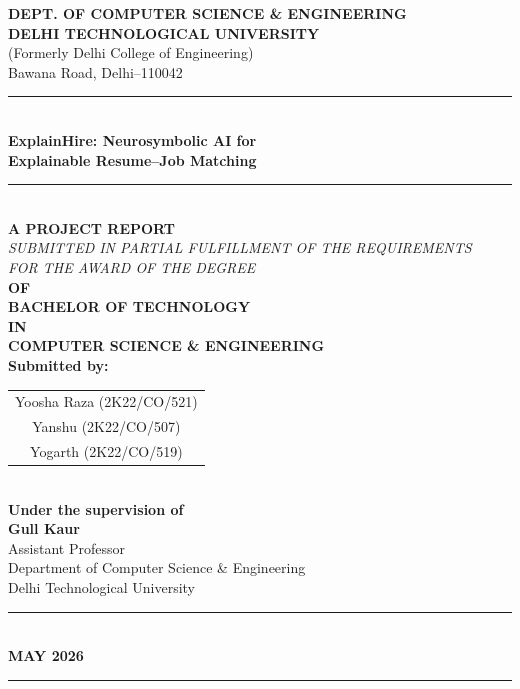 \documentclass[12pt,a4paper]{report}
\begin{document}
\begin{titlepage}
\pagestyle{empty}
\begin{center}

\textbf{\large DEPT. OF COMPUTER SCIENCE \& ENGINEERING}\\[4pt]
\textbf{\large DELHI TECHNOLOGICAL UNIVERSITY}\\[2pt]
{\small (Formerly Delhi College of Engineering)}\\
{\small Bawana Road, Delhi--110042}\\[24pt]

\rule{\linewidth}{0.5pt}\\[12pt]

{\LARGE \textbf{ExplainHire: Neurosymbolic AI for}}\\[8pt]
{\LARGE \textbf{Explainable Resume--Job Matching}}\\[12pt]

\rule{\linewidth}{0.5pt}\\[24pt]

\textbf{\large A PROJECT REPORT}\\[6pt]
\textit{SUBMITTED IN PARTIAL FULFILLMENT OF THE REQUIREMENTS}\\[2pt]
\textit{FOR THE AWARD OF THE DEGREE}\\[6pt]
{\Large \textbf{OF}}\\[6pt]
{\Large \textbf{BACHELOR OF TECHNOLOGY}}\\[6pt]
{\Large \textbf{IN}}\\[6pt]
{\Large \textbf{COMPUTER SCIENCE \& ENGINEERING}}\\[30pt]

\textbf{\large Submitted by:}\\[10pt]
\begin{tabular}{c}
  {\large Yoosha Raza \hspace{4pt} (2K22/CO/521)} \\[6pt]
  {\large Yanshu \hspace{4pt} (2K22/CO/507)} \\[6pt]
  {\large Yogarth \hspace{4pt} (2K22/CO/519)} \\
\end{tabular}\\[28pt]

\textbf{\large Under the supervision of}\\[8pt]
{\large \textbf{Gull Kaur}}\\[4pt]
Assistant Professor\\
Department of Computer Science \& Engineering\\
Delhi Technological University\\[28pt]

\rule{\linewidth}{0.5pt}\\[8pt]
{\large \textbf{MAY 2026}}\\[4pt]
\rule{\linewidth}{0.5pt}

\end{center}
\end{titlepage}
\end{document}
